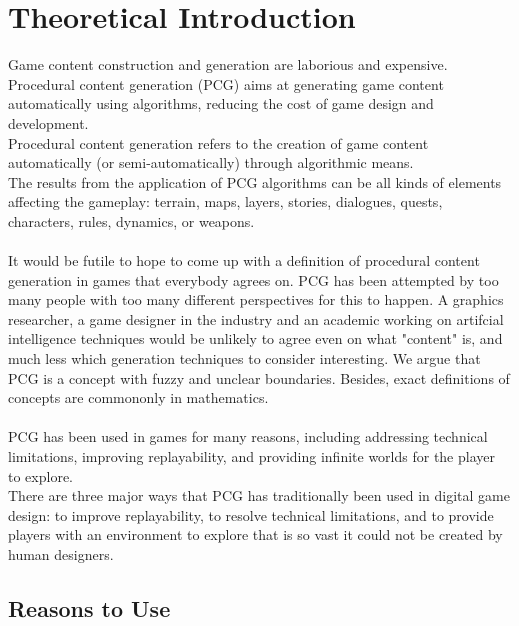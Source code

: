 \documentclass[MGS,Master,english]{twbook}%
\begin{document}
\section{Theoretical Introduction}
\cite{pcg::PCGinGameIndustry} Game content construction and generation are laborious and expensive. Procedural content generation (PCG) aims at generating game content automatically using algorithms, reducing the cost of game design and development.\\
Procedural content generation refers to the creation of game content automatically (or semi-automatically) through algorithmic means.\\
The results from the application of PCG algorithms can be all kinds of elements affecting the gameplay: terrain, maps, layers, stories, dialogues, quests, characters, rules, dynamics, or weapons.\\
\\
It would be futile to hope to come up with a definition of procedural content generation in games that everybody agrees on. PCG has been attempted by too many people with too many different perspectives for this to happen. A graphics researcher, a game designer in the industry and an academic working on artifcial intelligence techniques would be unlikely to agree even on what "content" is, and much less which generation techniques to consider interesting. We argue that PCG is a concept with fuzzy and unclear boundaries. Besides, exact definitions of concepts are commononly in mathematics. \cite{pcg::whatIsPCG}\\
\\
PCG has been used in games for many reasons, including addressing technical limitations, improving replayability, and providing infinite worlds for the player to explore. \cite{pcg::endlessWeb}\\
There are three major ways that PCG has traditionally been used in digital game design: to improve replayability, to resolve technical limitations, and to provide players with an environment to explore that is so vast it could not be created by human designers.\cite{pcg::endlessWeb}

\subsection{Reasons to Use}
\end{document}
